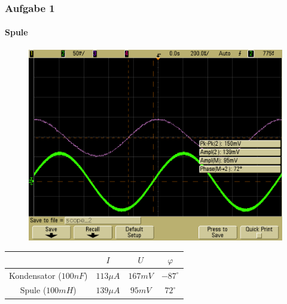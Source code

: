 \begin{frame}
\frametitle{Aufgabe 1}
\framesubtitle{Spule}
\begin{figure}[H]
    \begin{center}
                \includegraphics[scale=0.15]{./img/1b_Spule.png}
    \end{center}
\end{figure}
\begin{center}
\begin{tabular}{c|| c | c | c}
    & $I$ & $U$ & $\varphi$ \\
    \hline
    Kondensator ($100nF$)& $113 \mu A$ & $167mV$ & $-87^{\circ}$ \\
    Spule ($100mH$)& $139 \mu A$ & $95 mV$ & $72^{\circ}$ 
\end{tabular}
\end{center}
\end{frame}

